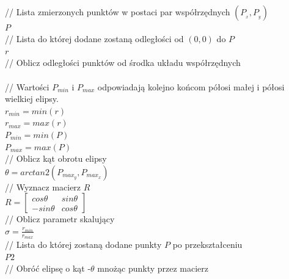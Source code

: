 \begin{algorithm}[H]
\SetAlgoLined
{}\\

// Lista zmierzonych punktów w postaci par współrzędnych $(P_{_x}, P_{_y})$ \\
$P$ \\
// Lista do której dodane zostaną odległości od $(0,0)$ do $P$ \\
$r$ \\[10pt]

// Oblicz odległości punktów od środka układu współrzędnych \\ 
\EndFor \\[10pt]

// Wartości $P_{min}$ i $P_{max}$ odpowiadają kolejno końcom półosi małej i półosi wielkiej elipsy. \\ 
$r_{min} = min(r)$ \\ 
$r_{max} = max(r)$ \\ 
$P_{min} = min(P)$ \\ 
$P_{max} = max(P)$ \\[10pt]

// Oblicz kąt obrotu elipsy \\ 
$\theta = arctan2(P_{max_y}, P_{max_x})$ \\[10pt]

// Wyznacz macierz $R$ \\
$R = \begin{bmatrix}
    cos\theta & sin\theta\\
    -sin\theta & cos\theta
    \end{bmatrix}$ \\[10pt]

// Oblicz parametr skalujący \\ 
$\sigma = \frac{r_{min}}{r_{max}}$ \\[10pt]

// Lista do której zostaną dodane punkty $P$ po przekształceniu \\
$P2$ \\[10pt]

// Obróć elipsę o kąt -$\theta$ mnożąc punkty przez macierz \\ 
\EndFor\\[10pt]


\end{algorithm}
